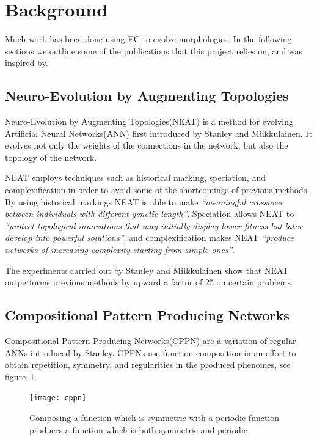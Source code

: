 \section{Background}
Much work has been done using EC to evolve morphologies. In the following
sections we outline some of the publications that this project relies on, and
was inspired by.

\subsection{Neuro-Evolution by Augmenting Topologies}
Neuro-Evolution by Augmenting Topologies(NEAT) is a method for evolving 
Artificial Neural Networks(ANN) first introduced by Stanley and 
Miikkulainen\cite{stanley2002evolving}.
It evolves not only the weights of the connections in the network, but also the 
topology of the network.

NEAT employs techniques such as historical marking, speciation, and 
complexification in order to avoid some of the shortcomings of previous methods.
By using historical markings NEAT is able to make \emph{``meaningful crossover 
between individuals with different
genetic length''}\cite[p.~50]{Floreano2008}.
Speciation allows NEAT to \emph{``protect topological innovations
that may initially display lower fitness but later
develop into powerful solutions''}\cite[p.~50]{Floreano2008}, and complexification 
makes NEAT \emph{``produce networks of increasing complexity
starting from simple ones''}\cite[p.~50]{Floreano2008}.

The experiments carried out by Stanley and Miikkulainen show that NEAT 
outperforms previous methods by upward a factor of 
25 on certain problems\cite[p.~2]{stanley2002evolving}.
\subsection{Compositional Pattern Producing Networks}
\label{sec:cppn}
Compositional Pattern Producing Networks(CPPN) are a variation of regular ANNs 
introduced by 
Stanley\cite{Stanley2007}.
CPPNs use function composition in an effort to obtain repetition, symmetry, and 
regularities in the produced phenomes, see figure~\ref{fig:cppn}.
\begin{figure}[ht]
\centering
\texttt{[image: cppn]}
\caption{Composing a function which is symmetric with a periodic function 
produces a function which is both symmetric and periodic \cite{Stanley2007}}
\label{fig:cppn}
\end{figure}

